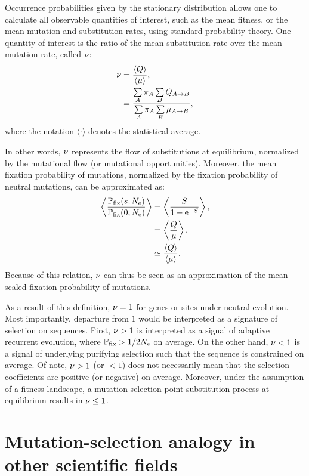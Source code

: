 Occurrence probabilities given by the stationary distribution allows one to calculate all observable quantities of interest, such as the mean fitness, or the mean mutation and substitution rates, using standard probability theory.
One quantity of interest is the ratio of the mean substitution rate over the mean mutation rate, called $ \nu $:
\begin{align}
    \nu & = \dfrac{ \langle Q \rangle }{\langle \mu \rangle},
    \label{eq:relative-sub-rate} \\
    & = \dfrac{ \sum\limits_{A} \pi_{A} \sum\limits_{B} Q_{A \to B}}{\sum\limits_{A} \pi_{A}  \sum\limits_{B} \mu_{A \to B}},
\end{align}
where the notation $\langle \cdot \rangle$ denotes the statistical average.

In other words, $ \nu $ represents the flow of substitutions at equilibrium, normalized by the mutational flow (or mutational opportunities).
Moreover, the mean fixation probability of mutations, normalized by the fixation probability of neutral mutations, can be approximated as:
\begin{align}
    \left\langle  \dfrac{ \mathbb{P}_{\mathrm{fix}} (s, N_{\textrm{e}} ) }{\mathbb{P}_{\mathrm{fix}} (0, N_{\textrm{e}} )}  \right\rangle & = \left\langle  \dfrac{ S }{1 - \mathrm{e}^{- S}} \right\rangle, \\
    & = \left\langle \dfrac{ Q }{\mu} \right\rangle, \\
    & \simeq \dfrac{ \langle Q \rangle }{\langle \mu \rangle}.
\end{align}
Because of this relation, $\nu$ can thus be seen as an approximation of the mean scaled fixation probability of mutations.

As a result of this definition, $\nu=1$ for genes or sites under neutral evolution.
Most importantly, departure from $1$ would be interpreted as a signature of selection on sequences.
First, $\nu>1$ is interpreted as a signal of adaptive recurrent evolution, where $\mathbb{P}_{\mathrm{fix}} > 1/2 N_{\textrm{e}}$ on average.
On the other hand, $\nu<1$ is a signal of underlying purifying selection such that the sequence is constrained on average.
Of note, $ \nu > 1$ (or $ < 1$) does not necessarily mean that the selection coefficients are positive (or negative) on average.
Moreover, under the assumption of a  fitness landscape, a mutation-selection point substitution process at equilibrium results in $\nu \leq 1$.

\section{Mutation-selection analogy in other scientific fields}

